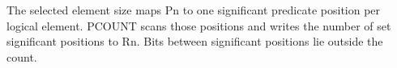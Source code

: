 The selected element size maps Pn to one significant predicate position per
logical element.  PCOUNT scans those positions and writes the number of set
significant positions to Rn.  Bits between significant positions lie outside
the count.
